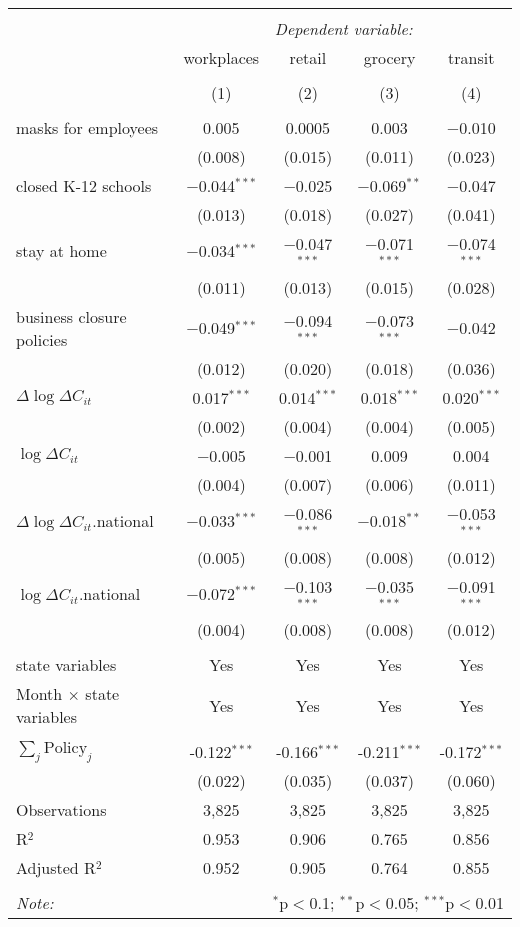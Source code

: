 \begin{tabular}{@{\extracolsep{1pt}}lcccc} 
\\[-1.8ex]\hline 
\hline \\[-1.8ex] 
 & \multicolumn{4}{c}{\textit{Dependent variable:}} \\ 
\cline{2-5} 
 & workplaces & retail & grocery & transit \\ 
\\[-1.8ex] & (1) & (2) & (3) & (4)\\ 
\hline \\[-1.8ex] 
 masks for employees & 0.005 & 0.0005 & 0.003 & $-$0.010 \\ 
  & (0.008) & (0.015) & (0.011) & (0.023) \\ 
  closed K-12 schools & $-$0.044$^{***}$ & $-$0.025 & $-$0.069$^{**}$ & $-$0.047 \\ 
  & (0.013) & (0.018) & (0.027) & (0.041) \\ 
  stay at home & $-$0.034$^{***}$ & $-$0.047$^{***}$ & $-$0.071$^{***}$ & $-$0.074$^{***}$ \\ 
  & (0.011) & (0.013) & (0.015) & (0.028) \\ 
  business closure policies & $-$0.049$^{***}$ & $-$0.094$^{***}$ & $-$0.073$^{***}$ & $-$0.042 \\ 
  & (0.012) & (0.020) & (0.018) & (0.036) \\ 
  $\Delta \log \Delta C_{it}$ & 0.017$^{***}$ & 0.014$^{***}$ & 0.018$^{***}$ & 0.020$^{***}$ \\ 
  & (0.002) & (0.004) & (0.004) & (0.005) \\ 
  $\log \Delta C_{it}$ & $-$0.005 & $-$0.001 & 0.009 & 0.004 \\ 
  & (0.004) & (0.007) & (0.006) & (0.011) \\ 
  $\Delta \log \Delta C_{it}$.national & $-$0.033$^{***}$ & $-$0.086$^{***}$ & $-$0.018$^{**}$ & $-$0.053$^{***}$ \\ 
  & (0.005) & (0.008) & (0.008) & (0.012) \\ 
  $\log \Delta C_{it}$.national & $-$0.072$^{***}$ & $-$0.103$^{***}$ & $-$0.035$^{***}$ & $-$0.091$^{***}$ \\ 
  & (0.004) & (0.008) & (0.008) & (0.012) \\ 
 \hline \\[-1.8ex] 
state variables & Yes & Yes & Yes & Yes \\ 
Month $\times$ state variables & Yes & Yes & Yes & Yes \\ 
\hline \\[-1.8ex] 
$\sum_j \mathrm{Policy}_j$ & -0.122$^{***}$ & -0.166$^{***}$ & -0.211$^{***}$ & -0.172$^{***}$ \\ 
 & (0.022) & (0.035) & (0.037) & (0.060) \\ 
Observations & 3,825 & 3,825 & 3,825 & 3,825 \\ 
R$^{2}$ & 0.953 & 0.906 & 0.765 & 0.856 \\ 
Adjusted R$^{2}$ & 0.952 & 0.905 & 0.764 & 0.855 \\ 
\hline 
\hline \\[-1.8ex] 
\textit{Note:}  & \multicolumn{4}{r}{$^{*}$p$<$0.1; $^{**}$p$<$0.05; $^{***}$p$<$0.01} \\ 
\end{tabular} 